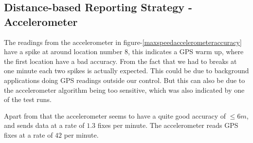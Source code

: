 \subsection{Distance-based Reporting Strategy - Accelerometer}
The readings from the accelerometer in figure-\ref{maxspeedaccelerometeraccuracy} have a spike at around location number 8, this indicates a GPS warm up, where the first location have a bad accuracy. From the fact that we had to breaks at one minute each two spikes is actually expected. This could be due to background applications doing GPS readings outside our control. But this can also be due to the accelerometer algorithm being too sensitive, which was also indicated by one of the test runs.

Apart from that the accelerometer seems to have a quite good accuracy of $\leq 6m$, and sends data at a rate of $1.3$ fixes per minute. The accelerometer reads GPS fixes at a rate of $42$ per minute. 